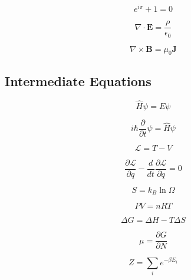 \documentclass{article}
\begin{document}
\begin{equation}\label{eq:008}
e^{i\pi} + 1 = 0
\end{equation}

\begin{equation}\label{eq:009}
\nabla \cdot \mathbf{E} = \frac{\rho}{\epsilon_0}
\end{equation}

\begin{equation}\label{eq:010}
\nabla \times \mathbf{B} = \mu_0 \mathbf{J}
\end{equation}

\subsection{Intermediate Equations}\label{subsec:intermediate}

\begin{equation}\label{eq:011}
\hat{H}\psi = E\psi
\end{equation}

\begin{equation}\label{eq:012}
i\hbar\frac{\partial}{\partial t}\psi = \hat{H}\psi
\end{equation}

\begin{equation}\label{eq:013}
\mathcal{L} = T - V
\end{equation}

\begin{equation}\label{eq:014}
\frac{\partial \mathcal{L}}{\partial q} - \frac{d}{dt}\frac{\partial \mathcal{L}}{\partial \dot{q}} = 0
\end{equation}

\begin{equation}\label{eq:015}
S = k_B \ln \Omega
\end{equation}

\begin{equation}\label{eq:016}
PV = nRT
\end{equation}

\begin{equation}\label{eq:017}
\Delta G = \Delta H - T\Delta S
\end{equation}

\begin{equation}\label{eq:018}
\mu = \frac{\partial G}{\partial N}
\end{equation}

\begin{equation}\label{eq:019}
Z = \sum_i e^{-\beta E_i}
\end{equation}
\end{document}
